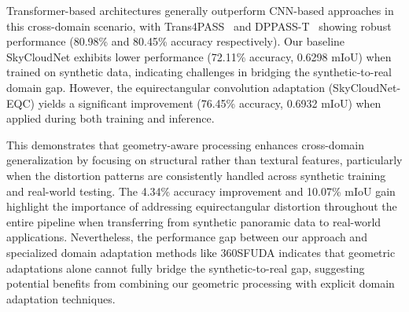 \documentclass[conference]{IEEEtran}
\begin{document}
Transformer-based architectures generally outperform CNN-based approaches in this cross-domain scenario, with Trans4PASS~\cite{zhang2022bending} and DPPASS-T~\cite{zheng2023both} showing robust performance (80.98\% and 80.45\% accuracy respectively). Our baseline SkyCloudNet exhibits lower performance (72.11\% accuracy, 0.6298 mIoU) when trained on synthetic data, indicating challenges in bridging the synthetic-to-real domain gap. However, the equirectangular convolution adaptation (SkyCloudNet-EQC) yields a significant improvement (76.45\% accuracy, 0.6932 mIoU) when applied during both training and inference.

This demonstrates that geometry-aware processing enhances cross-domain generalization by focusing on structural rather than textural features, particularly when the distortion patterns are consistently handled across synthetic training and real-world testing. The 4.34\% accuracy improvement and 10.07\% mIoU gain highlight the importance of addressing equirectangular distortion throughout the entire pipeline when transferring from synthetic panoramic data to real-world applications. Nevertheless, the performance gap between our approach and specialized domain adaptation methods like 360SFUDA indicates that geometric adaptations alone cannot fully bridge the synthetic-to-real gap, suggesting potential benefits from combining our geometric processing with explicit domain adaptation techniques.




        
        
\end{document}
